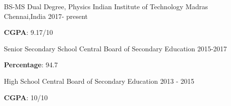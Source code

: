 

\begin{cventries}

  \cventry
    {BS-MS Dual Degree, Physics} %
    {Indian Institute of Technology Madras} %
    {Chennai,India} %
    {2017- present} %
    {
      \begin{cvitems} %
        \item {\textbf{CGPA}: 9.17/10}
      \end{cvitems}
    }

  \cventry
    {Senior Secondary School} %
    {Central Board of Secondary Education} %
    {} %
    {2015-2017} %
    {
      \begin{cvitems} %
        \item {\textbf{Percentage}: 94.7}
      \end{cvitems}
    }

  \cventry
    {High School} %
    {Central Board of Secondary Education} %
    {} %
    {2013 - 2015} %
    {
      \begin{cvitems} %
        \item {\textbf{CGPA}: 10/10}
      \end{cvitems}
    }

\end{cventries}
